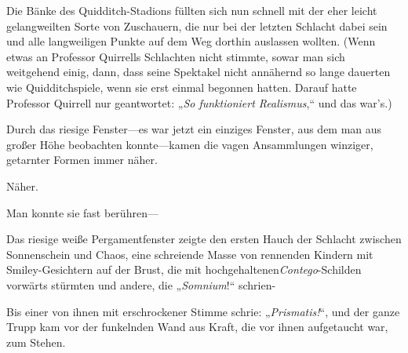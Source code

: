 Die Bänke des Quidditch-Stadions füllten sich nun schnell mit der eher leicht gelangweilten Sorte von Zuschauern, die nur bei der letzten Schlacht dabei sein und alle langweiligen Punkte auf dem Weg dorthin auslassen wollten. (Wenn etwas an Professor Quirrells Schlachten nicht stimmte, sowar man sich weitgehend einig, dann, dass seine Spektakel nicht annähernd so lange dauerten wie Quidditchspiele, wenn sie erst einmal begonnen hatten. Darauf hatte Professor Quirrell nur geantwortet: „\emph{So funktioniert Realismus},“ und das war's.)

Durch das riesige Fenster—es war jetzt ein einziges Fenster, aus dem man aus großer Höhe beobachten konnte—kamen die vagen Ansammlungen winziger, getarnter Formen immer näher.

Näher.

Man konnte sie fast berühren—

\later

Das riesige weiße Pergamentfenster zeigte den ersten Hauch der Schlacht zwischen Sonnenschein und Chaos, eine schreiende Masse von rennenden Kindern mit Smiley-Gesichtern auf der Brust, die mit hochgehaltenen\emph{Contego}-Schilden vorwärts stürmten und andere, die „\emph{Somnium}!“ schrien-

Bis einer von ihnen mit erschrockener Stimme schrie: „\emph{Prismatis!}“, und der ganze Trupp kam vor der funkelnden Wand aus Kraft, die vor ihnen aufgetaucht war, zum Stehen.

